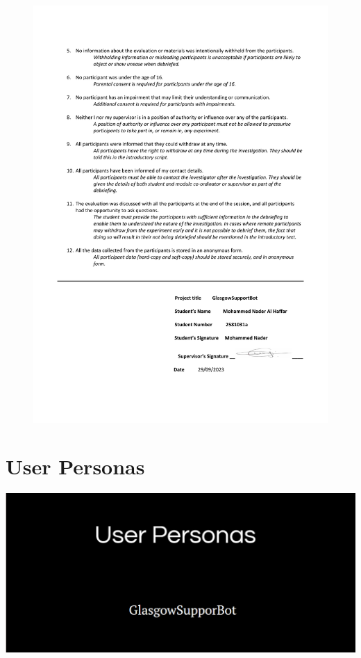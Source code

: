 \documentclass{l4proj}
\begin{document}
\begin{appendices}
\begin{figure}[h!]
  \centering
  \begin{adjustbox}{center,max height=0.9\textheight, max width=\linewidth}
    \includegraphics{images/Nader_Ethical_Checklist_2-end.pdf}
  \end{adjustbox}
\end{figure}


\chapter{User Personas}
\label{ch:User Personas}


\noindent\begin{minipage}{\linewidth}
    \centering
    \includegraphics[width=\linewidth]{images/userpersonas.png}
\end{minipage}


\end{appendices}
\end{document}
